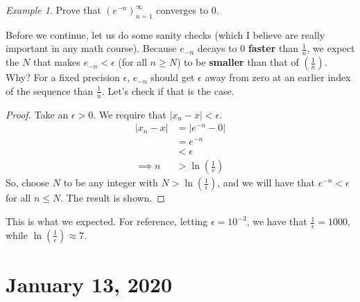 \documentclass[11pt]{article}
\theoremstyle{plain}
\theoremstyle{definition}
\theoremstyle{remark}
\newtheorem{exm}{Example}[section]
\begin{document}
\begin{exm}
    Prove that $(e^{-n})_{n=1}^\infty$ converges to 0.
    \label{exm2}
\end{exm}
Before we continue, let us do some sanity checks (which I believe are really important in any math course). Because $e_{-n}$ decays to 0 {\bf faster} than $\frac{1}{n}$, we expect the $N$ that makes $e_{-n} < \epsilon$ (for all $n \geq N$) to be {\bf smaller} than that of $(\frac{1}{n})$. Why? For a fixed precision $\epsilon$, $e_{-n}$ should get $\epsilon$ away from zero at an earlier index of the sequence than $\frac{1}{n}$. Let's check if that is the case.
\begin{proof}
    Take an $\epsilon > 0$. We require that $|x_n - x| < \epsilon$.
    \begin{align*}
        |x_n - x| &= |e^{-n} - 0|\\
        &= e^{-n}\\
        &< \epsilon\\
        \implies n &> \ln \left(\frac{1}{\epsilon}\right)
    \end{align*}
    So, choose $N$ to be any integer with $N > \ln \left(\frac{1}{\epsilon}\right)$, and we will have that $e^{-n} < \epsilon$ for all $n \leq N$. The result is shown.
\end{proof}
This is what we expected. For reference, letting $\epsilon = 10^{-3}$, we have that $\frac{1}{\epsilon} = 1000$, while $\ln \left(\frac{1}{\epsilon}\right) \approx 7$.

\section{January 13, 2020}
\end{document}
